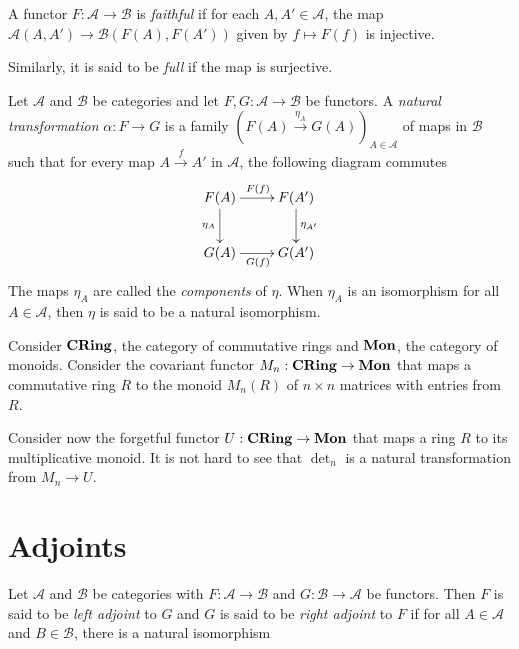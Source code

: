 \begin{definition}
    A functor $F:\mathscr A\to\mathscr B$ is \textit{faithful} if for each $A,A'\in\mathscr A$, the map $\mathscr A(A,A')\to\mathscr B(F(A),F(A'))$ given by $f\mapsto F(f)$ is injective.

    Similarly, it is said to be \textit{full} if the map is surjective.
\end{definition}

\begin{definition}
    Let $\mathscr A$ and $\mathscr B$ be categories and let $F, G:\mathscr A\longrightarrow\mathscr B$ be functors. A \textit{natural transformation} $\alpha: F\to G$ is a family $\left(F(A)\stackrel{\eta_A}{\longrightarrow}G(A)\right)_{A\in\mathscr A}$ of maps in $\mathscr B$ such that for every map $A\stackrel{f}{\longrightarrow}A'$ in $\mathscr A$, the following diagram commutes
    \begin{equation*}
        \xymatrix{
            F(A)\ar[r]^{F(f)}\ar[d]_{\eta_A} & F(A')\ar[d]^{\eta_{A'}}\\
            G(A)\ar[r]_{G(f)} & G(A')
        }
    \end{equation*}
    The maps $\eta_A$ are called the \textit{components} of $\eta$. When $\eta_A$ is an isomorphism for all $A\in\mathscr A$, then $\eta$ is said to be a natural isomorphism.
\end{definition}

Consider $\mathbf{CRing}$, the category of commutative rings and $\mathbf{Mon}$, the category of monoids. Consider the covariant functor $M_n:\mathbf{CRing}\to\mathbf{Mon}$ that maps a commutative ring $R$ to the monoid $M_n(R)$ of $n\times n$ matrices with entries from $R$. 

Consider now the forgetful functor $U:\mathbf{CRing}\to\mathbf{Mon}$ that maps a ring $R$ to its multiplicative monoid. It is not hard to see that $\det_n$ is a natural transformation from $M_n\to U$.

\section{Adjoints}

\begin{definition}
    Let $\mathscr A$ and $\mathscr B$ be categories with $F:\mathscr A\to\mathscr B$ and $G:\mathscr B\to\mathscr A$ be functors. Then $F$ is said to be \textit{left adjoint} to $G$ and $G$ is said to be \textit{right adjoint} to $F$ if for all $A\in\mathscr A$ and $B\in\mathscr B$, there is a natural isomorphism
\end{definition}